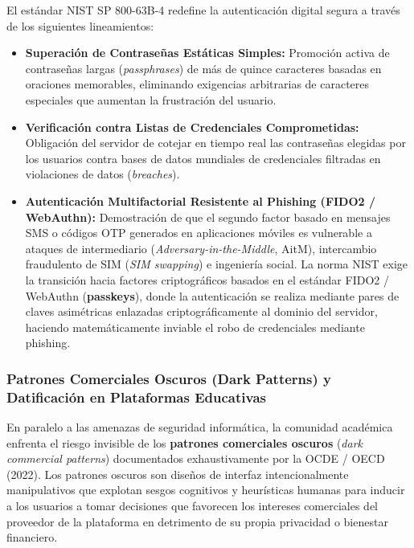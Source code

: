 El estándar NIST SP 800-63B-4 redefine la autenticación digital segura a través de los siguientes lineamientos:
\begin{itemize}
    \item \textbf{Superación de Contraseñas Estáticas Simples:} Promoción activa de contraseñas largas (\textit{passphrases}) de más de quince caracteres basadas en oraciones memorables, eliminando exigencias arbitrarias de caracteres especiales que aumentan la frustración del usuario.
    \item \textbf{Verificación contra Listas de Credenciales Comprometidas:} Obligación del servidor de cotejar en tiempo real las contraseñas elegidas por los usuarios contra bases de datos mundiales de credenciales filtradas en violaciones de datos (\textit{breaches}).
    \item \textbf{Autenticación Multifactorial Resistente al Phishing (FIDO2 / WebAuthn):} Demostración de que el segundo factor basado en mensajes SMS o códigos OTP generados en aplicaciones móviles es vulnerable a ataques de intermediario (\textit{Adversary-in-the-Middle}, AitM), intercambio fraudulento de SIM (\textit{SIM swapping}) e ingeniería social. La norma NIST exige la transición hacia factores criptográficos basados en el estándar FIDO2 / WebAuthn (\textbf{passkeys}), donde la autenticación se realiza mediante pares de claves asimétricas enlazadas criptográficamente al dominio del servidor, haciendo matemáticamente inviable el robo de credenciales mediante phishing.
\end{itemize}

\subsubsection{Patrones Comerciales Oscuros (Dark Patterns) y Datificación en Plataformas Educativas}

En paralelo a las amenazas de seguridad informática, la comunidad académica enfrenta el riesgo invisible de los \textbf{patrones comerciales oscuros} (\textit{dark commercial patterns}) documentados exhaustivamente por la OCDE / OECD (2022). Los patrones oscuros son diseños de interfaz intencionalmente manipulativos que explotan sesgos cognitivos y heurísticas humanas para inducir a los usuarios a tomar decisiones que favorecen los intereses comerciales del proveedor de la plataforma en detrimento de su propia privacidad o bienestar financiero.

